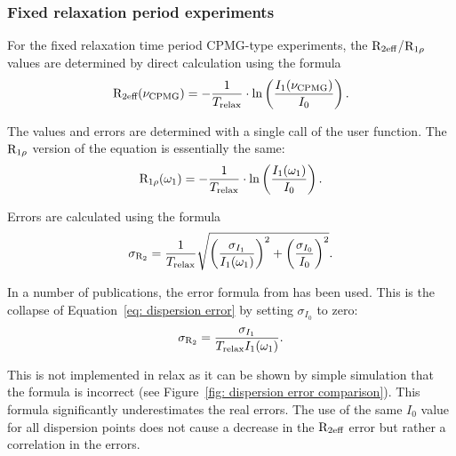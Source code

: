 \subsubsection{Fixed relaxation period experiments}

For the fixed relaxation time period CPMG-type experiments, the $\mathrm{R}_\textrm{2eff}$/$\mathrm{R}_{1\rho}$ values are determined by direct calculation using the formula
\begin{equation}
    \mathrm{R}_\textrm{2eff}(\nu_\textrm{CPMG}) = - \frac{1}{T_\textrm{relax}} \cdot \ln \left( \frac{I_1(\nu_\textrm{CPMG})}{I_0} \right) .
\end{equation}

The values and errors are determined with a single call of the  user function.  The $\mathrm{R}_{1\rho}$ version of the equation is essentially the same:
\begin{equation}
    \mathrm{R}_{1\rho}(\omega_1) = - \frac{1}{T_\textrm{relax}} \cdot \ln \left( \frac{I_1(\omega_1)}{I_0} \right) .
\end{equation}

Errors are calculated using the formula
\begin{equation} \label{eq: dispersion error}
    \sigma_{\mathrm{R}_2} = \frac{1}{T_\textrm{relax}} \sqrt{ \left( \frac{\sigma_{I_1}}{I_1(\omega_1)} \right)^2  +  \left( \frac{\sigma_{I_0}}{I_0} \right)^2 } .
\end{equation}

In a number of publications, the error formula from \citet{IshimaTorchia05} has been used.  This is the collapse of Equation~\ref{eq: dispersion error} by setting $\sigma_{I_0}$ to zero:
\begin{equation} \label{eq: IT05 dispersion error}
    \sigma_{\mathrm{R}_2} = \frac{\sigma_{I_1}}{T_\textrm{relax} I_1(\omega_1)} .
\end{equation}

This is not implemented in relax as it can be shown by simple simulation that the formula is incorrect (see Figure~\ref{fig: dispersion error comparison}).  This formula significantly underestimates the real errors.  The use of the same $I_0$ value for all dispersion points does not cause a decrease in the $\mathrm{R}_\textrm{2eff}$ error but rather a correlation in the errors.

